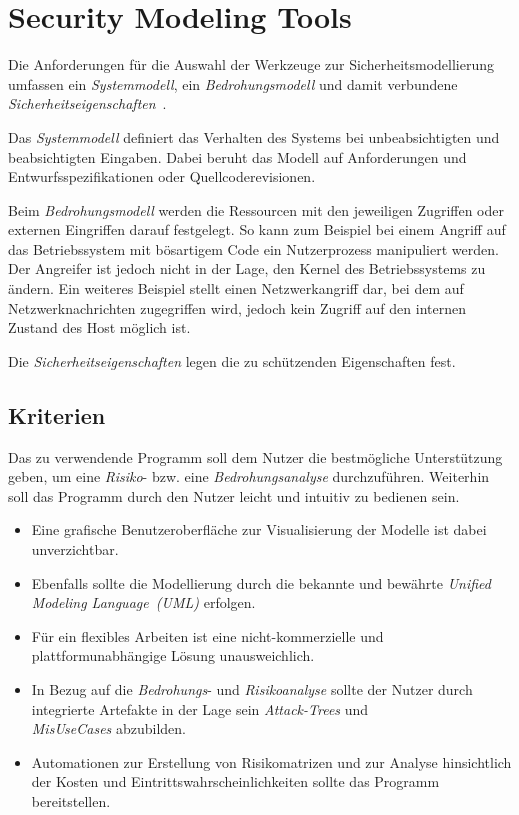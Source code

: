 \section{Security Modeling Tools}

Die Anforderungen für die Auswahl der Werkzeuge zur Sicherheitsmodellierung umfassen ein \textit{Systemmodell}, ein \textit{Bedrohungsmodell} und 
damit verbundene \textit{Sicherheitseigenschaften}~\cite{bau2011security}.

Das \textit{Systemmodell} definiert das Verhalten des Systems bei unbeabsichtigten und beabsichtigten Eingaben.
Dabei beruht das Modell auf Anforderungen und Entwurfsspezifikationen oder Quellcoderevisionen.

Beim \textit{Bedrohungsmodell} werden die Ressourcen mit den jeweiligen Zugriffen oder externen Eingriffen darauf festgelegt.
So kann zum Beispiel bei einem Angriff auf das Betriebssystem mit bösartigem Code ein Nutzerprozess manipuliert werden. Der Angreifer ist 
jedoch nicht in der Lage, den Kernel des Betriebssystems zu ändern.
Ein weiteres Beispiel stellt einen Netzwerkangriff dar, bei dem auf Netzwerknachrichten zugegriffen wird, jedoch kein Zugriff auf den internen Zustand
des Host möglich ist.

Die \textit{Sicherheitseigenschaften} legen die zu schützenden Eigenschaften fest.

\subsection{Kriterien}
Das zu verwendende Programm soll dem Nutzer die bestmögliche Un\-ter\-stüt\-zung geben, um eine \textit{Risiko}- bzw. eine \textit{Bedrohungsanalyse} durchzuführen.
Weiterhin soll das Programm durch den Nutzer leicht und intuitiv zu bedienen sein.
\begin{itemize}
\item Eine grafische Benutzeroberfläche zur Visualisierung der Modelle ist dabei unverzichtbar.

\item Ebenfalls sollte die Modellierung durch die bekannte und bewährte \textit{Unified Modeling Language~(UML)} erfolgen.

\item Für ein flexibles Arbeiten ist eine nicht-kommerzielle und platt\-form\-un\-ab\-häng\-ige Lösung unausweichlich.

\item In Bezug auf die \textit{Bedrohungs}- und \textit{Risikoanalyse} sollte der Nutzer durch integrierte Artefakte in der Lage sein \textit{Attack-Trees} und\\ \textit{MisUseCases}
abzubilden.

\item Automationen zur Erstellung von Risikomatrizen und zur Analyse hinsichtlich der Kosten und Eintrittswahrscheinlichkeiten sollte das Programm bereitstellen.
\end{itemize}

